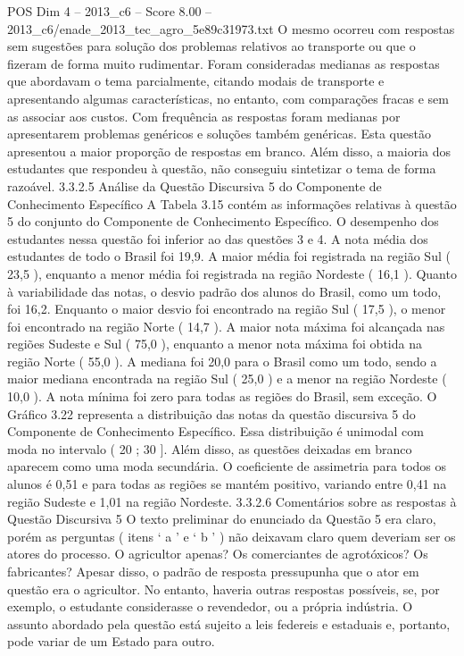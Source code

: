\begin{textsample}{POS Dim 4 – 2013\_c6 – Score 8.00 – 2013\_c6/enade\_2013\_tec\_agro\_5e89c31973.txt}
O mesmo ocorreu com respostas sem sugestões para solução dos problemas relativos ao transporte ou que o fizeram de forma muito rudimentar.
Foram consideradas medianas as respostas que abordavam o tema parcialmente, citando modais de transporte e apresentando algumas características, no entanto, com comparações fracas e sem as associar aos custos.
Com frequência as respostas foram medianas por apresentarem problemas genéricos e soluções também genéricas.
Esta questão apresentou a maior proporção de respostas em branco.
Além disso, a maioria dos estudantes que respondeu à questão, não conseguiu sintetizar o tema de forma razoável. 3.3.2.5 Análise da Questão Discursiva 5 do Componente de Conhecimento Específico A Tabela 3.15 contém as informações relativas à questão 5 do conjunto do Componente de Conhecimento Específico.
O desempenho dos estudantes nessa questão foi inferior ao das questões 3 e 4.
A nota média dos estudantes de todo o Brasil foi 19,9.
A maior média foi registrada na região Sul ( 23,5 ), enquanto a menor média foi registrada na região Nordeste ( 16,1 ).
Quanto à variabilidade das notas, o desvio padrão dos alunos do Brasil, como um todo, foi 16,2.
Enquanto o maior desvio foi encontrado na região Sul ( 17,5 ), o menor foi encontrado na região Norte ( 14,7 ).
A maior nota máxima foi alcançada nas regiões Sudeste e Sul ( 75,0 ), enquanto a menor nota máxima foi obtida na região Norte ( 55,0 ).
A mediana foi 20,0 para o Brasil como um todo, sendo a maior mediana encontrada na região Sul ( 25,0 ) e a menor na região Nordeste ( 10,0 ).
A nota mínima foi zero para todas as regiões do Brasil, sem exceção.
O Gráfico 3.22 representa a distribuição das notas da questão discursiva 5 do Componente de Conhecimento Específico.
Essa distribuição é unimodal com moda no intervalo ( 20 ; 30 ].
Além disso, as questões deixadas em branco aparecem como uma moda secundária.
O coeficiente de assimetria para todos os alunos é 0,51 e para todas as regiões se mantém positivo, variando entre 0,41 na região Sudeste e 1,01 na região Nordeste. 3.3.2.6 Comentários sobre as respostas à Questão Discursiva 5 O texto preliminar do enunciado da Questão 5 era claro, porém as perguntas ( itens ‘ a ’ e ‘ b ’ ) não deixavam claro quem deveriam ser os atores do processo.
O agricultor apenas?
Os comerciantes de agrotóxicos?
Os fabricantes?
Apesar disso, o padrão de resposta pressupunha que o ator em questão era o agricultor.
No entanto, haveria outras respostas possíveis, se, por exemplo, o estudante considerasse o revendedor, ou a própria indústria.
O assunto abordado pela questão está sujeito a leis federeis e estaduais e, portanto, pode variar de um Estado para outro.

\end{textsample}

